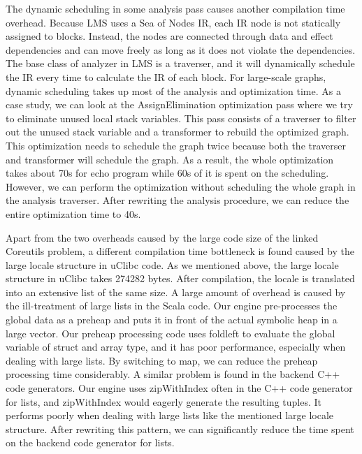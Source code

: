 \documentclass[sigplan, nonacm]{acmart}\settopmatter{printfolios=true,printccs=false,printacmref=false}
\begin{document}
The dynamic scheduling in some analysis pass causes another compilation time overhead. Because LMS uses a Sea of Nodes IR, each IR node is not statically assigned to blocks. Instead, the nodes are connected through data and effect dependencies and can move freely as long as it does not violate the dependencies. The base class of analyzer in LMS is a traverser, and it will dynamically schedule the IR every time to calculate the IR of each block. For large-scale graphs, dynamic scheduling takes up most of the analysis and optimization time. As a case study, we can look at the AssignElimination optimization pass where we try to eliminate unused local stack variables. This pass consists of a traverser to filter out the unused stack variable and a transformer to rebuild the optimized graph. This optimization needs to schedule the graph twice because both the traverser and transformer will schedule the graph. As a result, the whole optimization takes about 70s for echo program while 60s of it is spent on the scheduling. However, we can perform the optimization without scheduling the whole graph in the analysis traverser. After rewriting the analysis procedure, we can reduce the entire optimization time to 40s. \par
Apart from the two overheads caused by the large code size of the linked Coreutils problem, a different compilation time bottleneck is found caused by the large locale structure in uClibc code. As we mentioned above, the large locale structure in uClibc takes 274282 bytes. After compilation, the locale is translated into an extensive list of the same size. A large amount of overhead is caused by the ill-treatment of large lists in the Scala code. Our engine pre-processes the global data as a preheap and puts it in front of the actual symbolic heap in a large vector. Our preheap processing code uses foldleft to evaluate the global variable of struct and array type, and it has poor performance, especially when dealing with large lists. By switching to map, we can reduce the preheap processing time considerably. A similar problem is found in the backend C++ code generators. Our engine uses zipWithIndex often in the C++ code generator for lists, and zipWithIndex would eagerly generate the resulting tuples. It performs poorly when dealing with large lists like the mentioned large locale structure. After rewriting this pattern, we can significantly reduce the time spent on the backend code generator for lists.
\end{document}

